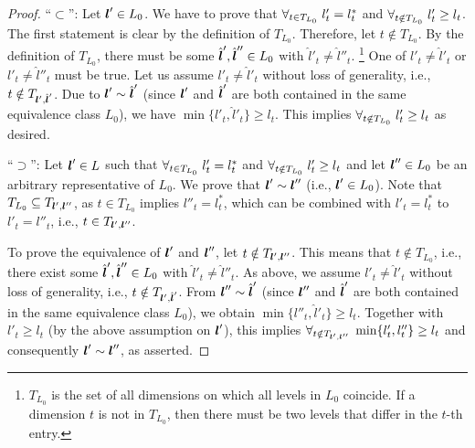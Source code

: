 \begin{proof}
  ``$\subset$'':
  Let ${\boldsymbol{l}}' \in L_0$.
  We have to prove that
  $\forall_{t \in T_{L_0}}\;l'_t = l^\ast_t$ and
  $\forall_{t \notin T_{L_0}}\;l'_t \ge l_t$.
  The first statement is clear by the definition of $T_{L_0}$.
  Therefore, let $t \notin T_{L_0}$.
  By the definition of $T_{L_0}$,
  there must be some $\hat{{\boldsymbol{l}}}', \hat{{\boldsymbol{l}}}'' \in L_0$ with
  $\hat{l}'_t \not= \hat{l}''_t$.%
  \footnote{%
    $T_{L_0}$ is the set of all dimensions on which all levels
    in $L_0$ coincide.
    If a dimension $t$ is not in $T_{L_0}$, then there must be two levels
    that differ in the $t$-th entry.%
  }
  One of $l'_t \not= \hat{l}'_t$ or $l'_t \not= \hat{l}''_t$ must be true.
  Let us assume $l'_t \not= \hat{l}'_t$ without loss of generality, i.e.,
  $t \notin T_{{\boldsymbol{l}}',\hat{{\boldsymbol{l}}}'}$.
  Due to ${\boldsymbol{l}}' \sim \hat{{\boldsymbol{l}}}'$
  (since ${\boldsymbol{l}}'$ and $\hat{{\boldsymbol{l}}}'$ are both contained in the same
  equivalence class $L_0$),
  we have $\min\{l'_t, \hat{l}'_t\} \ge l_t$.
  This implies $\forall_{t \notin T_{L_0}}\;l'_t \ge l_t$ as desired.
  
  ``$\supset$'':
  Let ${\boldsymbol{l}}' \in L$ such that
  $\forall_{t \in T_{L_0}}\;l'_t = l^\ast_t$ and
  $\forall_{t \notin T_{L_0}}\;l'_t \ge l_t$
  and let ${\boldsymbol{l}}'' \in L_0$ be an arbitrary representative of $L_0$.
  We prove that ${\boldsymbol{l}}' \sim {\boldsymbol{l}}''$ (i.e., ${\boldsymbol{l}}' \in L_0$).
  Note that $T_{L_0} \subseteq T_{{\boldsymbol{l}}',{\boldsymbol{l}}''}$,
  as $t \in T_{L_0}$ implies
  $l''_t = l^\ast_t$, which can be combined with $l'_t = l^\ast_t$
  to $l'_t = l''_t$, i.e., $t \in T_{{\boldsymbol{l}}',{\boldsymbol{l}}''}$.
  
  To prove the equivalence of ${\boldsymbol{l}}'$ and ${\boldsymbol{l}}''$,
  let $t \notin T_{{\boldsymbol{l}}',{\boldsymbol{l}}''}$.
  This means that $t \notin T_{L_0}$, i.e.,
  there exist some
  $\hat{{\boldsymbol{l}}}', \hat{{\boldsymbol{l}}}'' \in L_0$ with
  $\hat{l}'_t \not= \hat{l}''_t$.
  As above, we assume $l'_t \not= \hat{l}'_t$ without loss of generality, i.e.,
  $t \notin T_{{\boldsymbol{l}}',\hat{{\boldsymbol{l}}}'}$.
  From ${\boldsymbol{l}}'' \sim \hat{{\boldsymbol{l}}}'$
  (since ${\boldsymbol{l}}''$ and $\hat{{\boldsymbol{l}}}'$ are both contained in the same
  equivalence class $L_0$),
  we obtain $\min\{l''_t, \hat{l}'_t\} \ge l_t$.
  Together with $l'_t \ge l_t$ (by the above assumption on ${\boldsymbol{l}}'$),
  this implies
  $\forall_{t \notin T_{{\boldsymbol{l}}',{\boldsymbol{l}}''}}\;\min\{l'_t, l''_t\} \ge l_t$
  and consequently ${\boldsymbol{l}}' \sim {\boldsymbol{l}}''$,
  as asserted.
\end{proof}

\propCombiTechniqueZero*

